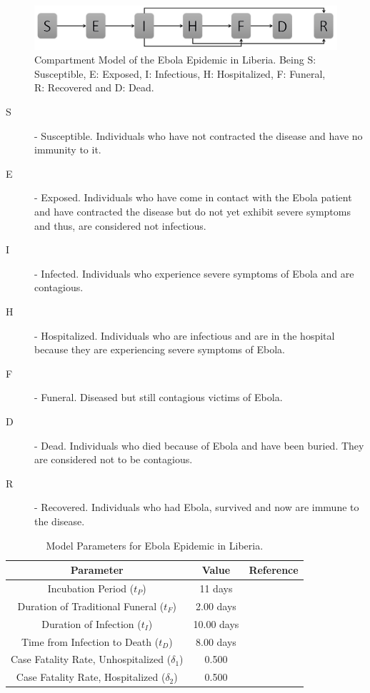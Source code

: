 \begin{figure}[!h]
  \centering
  \includegraphics[width=1\textwidth]{compartmentNoFlow}
  \caption{Compartment Model of the Ebola Epidemic in Liberia. \newline  Being S: Susceptible, E: Exposed, I: Infectious, H: Hospitalized, F: Funeral,  R: Recovered and D: Dead.  } 
\label{fig:compartmentNoFlow} 
\end{figure}

\begin{description}
\item[S]- Susceptible. Individuals who have not contracted the disease and have no immunity to it. 
\item[E] - Exposed. Individuals who have come in contact with the Ebola patient and have contracted the disease but do not yet exhibit severe symptoms and thus, are considered not infectious.
\item[I] - Infected. Individuals who experience severe symptoms of Ebola and are contagious.
\item[H] - Hospitalized. Individuals who are infectious and are in the hospital because they are experiencing severe symptoms of Ebola.
\item[F] - Funeral. Diseased but still contagious victims of Ebola. 
\item[D] - Dead. Individuals who died because of Ebola and have been buried. They are considered not to be contagious.
\item[R] - Recovered. Individuals who had Ebola, survived and now are immune to the disease.
\end{description}




\begin{table}[ht]
\caption{Model Parameters for Ebola Epidemic in Liberia.} %
\centering %
\begin{tabular}{c c c}
\hline\hline %
Parameter & Value  & Reference \\ [0.5ex]
\hline %
Incubation Period (${t_{P}}$) & 11 days & \cite{WHOFacts} \\
Duration of Traditional Funeral (${t_{F}}$) & 2.00 days & \cite{Rivers2014} \\
Duration of Infection (${t_{I}}$) & 10.00 days & \cite{Rivers2014} \\
Time from Infection to Death (${t_{D}}$) & 8.00 days & \cite{Rivers2014} \\
Case Fatality Rate, Unhospitalized ($\delta_{1}$) & 0.500 & \cite{WHOFacts} \\
Case Fatality Rate, Hospitalized ($\delta_{2}$) & 0.500 & \cite{WHOFacts} \\ [1ex]
\hline
\end{tabular}
\label{tab:knownParameters}
\end{table}



